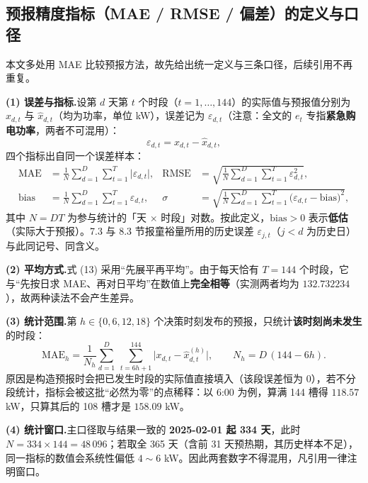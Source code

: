 \documentclass{cumcmthesis}
\begin{document}
\subsection{预报精度指标（MAE / RMSE / 偏差）的定义与口径}
本文多处用 MAE 比较预报方法，故先给出统一定义与三条口径，后续引用不再重复。

\noindent\textbf{(1) 误差与指标.}设第 $d$ 天第 $t$ 个时段（$t=1,\dots,144$）的实际值与预报值分别为 $x_{d,t}$ 与 $\hat x_{d,t}$（均为功率，单位 kW），误差记为 $\varepsilon_{d,t}$（注意：全文的 $e_t$ 专指\textbf{紧急购电功率}，两者不可混用）：
\begin{equation}
    \varepsilon_{d,t}=x_{d,t}-\hat x_{d,t},
\end{equation}
四个指标出自同一个误差样本：
\begin{align}
    \mathrm{MAE}&=\frac{1}{N}\sum_{d=1}^{D}\sum_{t=1}^{T}\bigl|\varepsilon_{d,t}\bigr|, &
    \mathrm{RMSE}&=\sqrt{\frac{1}{N}\sum_{d=1}^{D}\sum_{t=1}^{T}\varepsilon_{d,t}^{2}},\\
    \mathrm{bias}&=\frac{1}{N}\sum_{d=1}^{D}\sum_{t=1}^{T}\varepsilon_{d,t}, &
    \sigma&=\sqrt{\frac{1}{N}\sum_{d=1}^{D}\sum_{t=1}^{T}\bigl(\varepsilon_{d,t}-\mathrm{bias}\bigr)^{2}},
\end{align}
其中 $N=DT$ 为参与统计的「天 $\times$ 时段」对数。按此定义，$\mathrm{bias}>0$ 表示\textbf{低估}（实际大于预报）。7.3 与 8.3 节报童裕量所用的历史误差 $\varepsilon_{j,t}$（$j<d$ 为历史日）与此同记号、同含义。

\noindent\textbf{(2) 平均方式.}式 (13) 采用“先展平再平均”。由于每天恰有 $T=144$ 个时段，它与“先按日求 MAE、再对日平均”在数值上\textbf{完全相等}（实测两者均为 $132.732234$），故两种读法不会产生差异。

\noindent\textbf{(3) 统计范围.}第 $h\in\{0,6,12,18\}$ 个决策时刻发布的预报，只统计\textbf{该时刻尚未发生}的时段：
\begin{equation}
    \mathrm{MAE}_h=\frac{1}{N_h}\sum_{d=1}^{D}\ \sum_{t=6h+1}^{144}\bigl|x_{d,t}-\hat x^{(h)}_{d,t}\bigr|,
    \qquad N_h=D\,(144-6h).
\end{equation}
原因是构造预报时会把已发生时段的实际值直接填入（该段误差恒为 $0$），若不分段统计，指标会被这批“必然为零”的点稀释：以 6:00 为例，算满 144 槽得 $118.57$ kW，只算其后的 108 槽才是 $158.09$ kW。

\noindent\textbf{(4) 统计窗口.}主口径取与结果一致的 \textbf{2025-02-01 起 334 天}，此时 $N=334\times144=48\,096$；若取全 365 天（含前 31 天预热期，其历史样本不足），同一指标的数值会系统性偏低 $4\sim6$ kW。因此两套数字不得混用，凡引用一律注明窗口。
\end{document}
